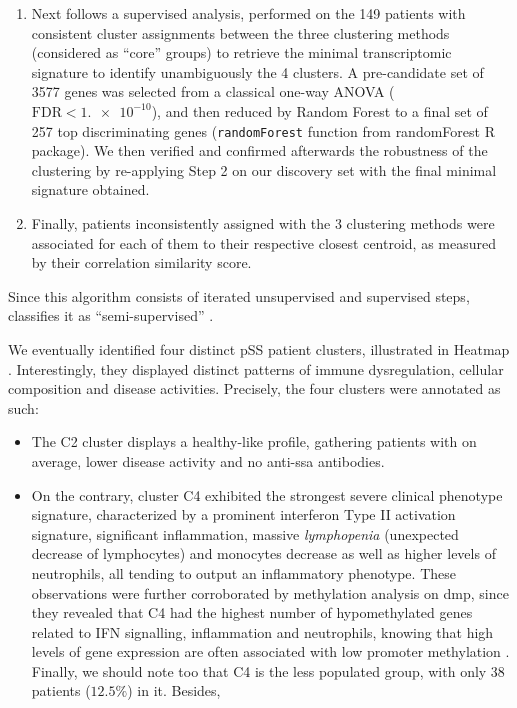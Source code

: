 \documentclass[mainlanguage=english,numlaboratories=2, nofrontcover=true,noaim=false, localbibs, colophon-location=verso-frontcover, oneside, 10pt, localtocs, version=final, nomakeabstract=true]{yathesis}
\begin{document}
{\begin{enumerate}
\item Next follows a supervised analysis, performed on the 149 patients with consistent cluster assignments between the three clustering methods (considered as \enquote{core} groups) to retrieve the minimal transcriptomic signature to identify unambiguously the 4 clusters. A pre-candidate set of \num{3577} genes was selected from a classical one-way ANOVA
($\text{FDR} < \num {1.e-10}$), and then reduced by Random Forest to a final set of 257 top discriminating genes (\texttt{randomForest} function from randomForest \autocite{cutler_wiener22} R package). We then verified and confirmed afterwards the robustness of the clustering by re-applying Step 2 on our discovery set with the final minimal signature obtained.

\item Finally, patients inconsistently assigned with the 3 clustering methods were associated for each of them to their respective closest centroid, as measured by their correlation similarity score.
\end{enumerate}

Since this algorithm consists of iterated unsupervised and supervised steps, \autocite{guedj_etal12} classifies it as \enquote{semi-supervised} .


We eventually identified four distinct pSS patient clusters, illustrated in Heatmap . Interestingly, they displayed distinct patterns of immune dysregulation, cellular composition and disease activities. Precisely, the four clusters were annotated as such:

\begin{itemize}
\item The C2 cluster displays a healthy-like profile, gathering patients with on average, lower disease activity and no \Gls{anti-ssa} antibodies.

\item  On the contrary, cluster C4 exhibited the strongest severe clinical phenotype signature, characterized by a prominent \gls{interferon} Type II activation signature, significant inflammation, massive \emph{lymphopenia} (unexpected decrease of lymphocytes) and monocytes decrease as well as higher levels of neutrophils, all tending to output an inflammatory phenotype. These observations were further corroborated by methylation analysis on \acrshort{dmp}, since they revealed that C4 had the highest number of hypomethylated genes related to IFN signalling, inflammation and neutrophils, knowing that high levels of gene expression are often associated with low promoter methylation \autocite{wagner_etal14}. Finally, we should note too that C4 is the less populated group, with only 38 patients ($12.5\%$) in it. Besides, 


\end{itemize}}
\end{document}
